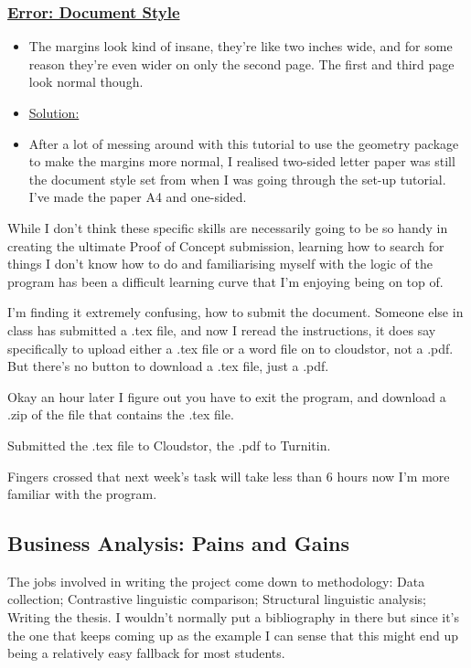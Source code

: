 \documentclass[12pt]{article}
\begin{document}
\subsubsection{\texorpdfstring{\underline{Error: Document Style}}{}}\label{error:er5}
\begin{itemize}
    \item The margins look kind of insane, they’re like two inches wide, and for some reason they’re even wider on only the second page. The first and third page look normal though.
\end{itemize}
\begin{itemize}
\renewcommand{\labelitemi}{}
\item \underline{Solution:}
\renewcommand{\labelitemi}{$\bullet$}
    \item After a lot of messing around with this tutorial to use the geometry package to make the margins more normal, I realised two-sided letter paper was still the document style set from when I was going through the set-up tutorial. I’ve made the paper A4 and one-sided.
\end{itemize}

While I don’t think these specific skills are necessarily going to be so handy in creating the ultimate Proof of Concept submission, learning how to search for things I don’t know how to do and familiarising myself with the logic of the program has been a difficult learning curve that I’m enjoying being on top of.

I’m finding it extremely confusing, how to submit the document. Someone else in class has submitted a .tex file, and now I reread the instructions, it does say specifically to upload either a .tex file or a word file on to cloudstor, not a .pdf. But there’s no button to download a .tex file, just a .pdf.

Okay an hour later I figure out you have to exit the program, and download a .zip of the file that contains the .tex file. 

Submitted the .tex file to Cloudstor, the .pdf to Turnitin.

Fingers crossed that next week’s task will take less than 6 hours now I’m more familiar with the program.

\subsection{Business Analysis: Pains and Gains}
The jobs involved in writing the project come down to methodology: Data collection; Contrastive linguistic comparison; Structural linguistic analysis; Writing the thesis. I wouldn't normally put a bibliography in there but since it's the one that keeps coming up as the example I can sense that this might end up being a relatively easy fallback for most students.
\end{document}
